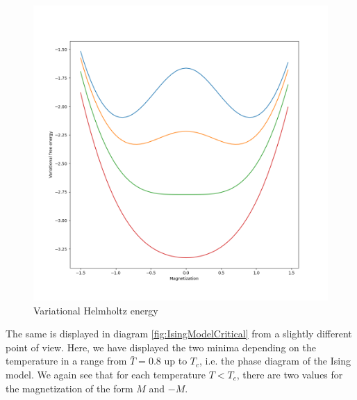\documentclass[a4paper, draft]{article}
\theoremstyle{own}
\theoremstyle{remark}
\begin{document}
\begin{figure}[ht]
	\centering
	\includegraphics[scale=.5]{IsingModelHelmholtzEnergy}
	\caption{Variational Helmholtz energy}
	\label{fig:IsingModelHelmholtz}
\end{figure}

The same is displayed in diagram \ref{fig:IsingModelCritical} from a slightly different point of view. Here, we have displayed the two minima depending on the temperature in a range from $\bar{T} = 0.8$ up to $T_c$, i.e. the phase diagram of the Ising model. We again see that for each temperature $T < T_c$, there are two values for the magnetization of the form $M$ and $-M$. 
\end{document}
